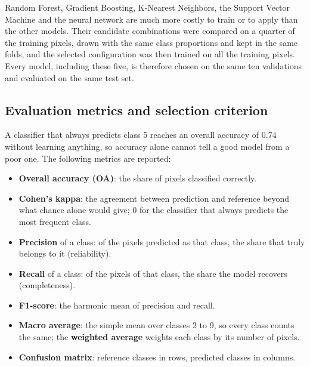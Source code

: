 \documentclass[11pt,a4paper]{article}
\begin{document}
\begin{table}[H]
\centering\footnotesize
\caption{Candidate values of the hyper-parameters of each model. Every
combination was evaluated.}
\label{tab:grid}

\end{table}

Random Forest, Gradient Boosting, K-Nearest Neighbors, the Support Vector
Machine and the neural network are much more costly to train or to apply than
the other models. Their candidate combinations were compared on a quarter of
the training pixels, drawn with the same class proportions and kept in the
same folds, and the selected configuration was then trained on all the
training pixels. Every model, including these five, is therefore chosen on the
same ten validations and evaluated on the same test set.

\subsection{Evaluation metrics and selection criterion}

A classifier that always predicts class 5 reaches an overall accuracy of 0.74
without learning anything, so accuracy alone cannot tell a good model from a
poor one. The following metrics are reported:

\begin{itemize}
  \item \textbf{Overall accuracy (OA)}: the share of pixels classified
  correctly.
  \item \textbf{Cohen's kappa}: the agreement between prediction and reference
  beyond what chance alone would give; 0 for the classifier that always
  predicts the most frequent class.
  \item \textbf{Precision} of a class: of the pixels predicted as that class,
  the share that truly belongs to it (reliability).
  \item \textbf{Recall} of a class: of the pixels of that class, the share the
  model recovers (completeness).
  \item \textbf{F1-score}: the harmonic mean of precision and recall.
  \item \textbf{Macro average}: the simple mean over classes 2 to 9, so every
  class counts the same; the \textbf{weighted average} weights each class by
  its number of pixels.
  \item \textbf{Confusion matrix}: reference classes in rows, predicted classes
  in columns.
\end{itemize}
\end{document}
